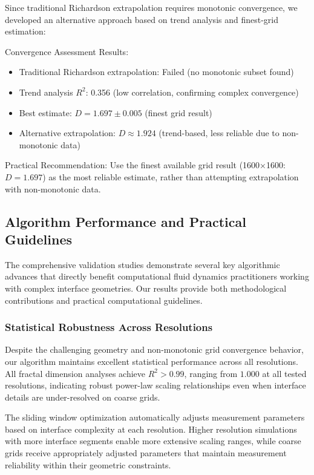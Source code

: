 \documentclass[preprint,12pt]{elsarticle}
\def\textbf#1{#1}%
\begin{document}
Since traditional Richardson extrapolation requires monotonic convergence, we developed an alternative approach based on trend analysis and finest-grid estimation:

\textbf{Convergence Assessment Results}:
\begin{itemize}
\item Traditional Richardson extrapolation: \textbf{Failed} (no monotonic subset found)
\item Trend analysis $R^2$: 0.356 (low correlation, confirming complex convergence)
\item \textbf{Best estimate}: $D = 1.697 \pm 0.005$ (finest grid result)
\item Alternative extrapolation: $D \approx 1.924$ (trend-based, less reliable due to non-monotonic data)
\end{itemize}

\textbf{Practical Recommendation}: Use the finest available grid result (1600×1600: $D = 1.697$) as the most reliable estimate, rather than attempting extrapolation with non-monotonic data.

\subsection{Algorithm Performance and Practical Guidelines}
\label{subsec:practical_impact}

The comprehensive validation studies demonstrate several key algorithmic advances that directly benefit computational fluid dynamics practitioners working with complex interface geometries. Our results provide both methodological contributions and practical computational guidelines.

\subsubsection{Statistical Robustness Across Resolutions}

Despite the challenging geometry and non-monotonic grid convergence behavior, our algorithm maintains excellent statistical performance across all resolutions. All fractal dimension analyses achieve $R^2 > 0.99$, ranging from $1.000$ at all tested resolutions, indicating robust power-law scaling relationships even when interface details are under-resolved on coarse grids.

The sliding window optimization automatically adjusts measurement parameters based on interface complexity at each resolution. Higher resolution simulations with more interface segments enable more extensive scaling ranges, while coarse grids receive appropriately adjusted parameters that maintain measurement reliability within their geometric constraints.
\end{document}
